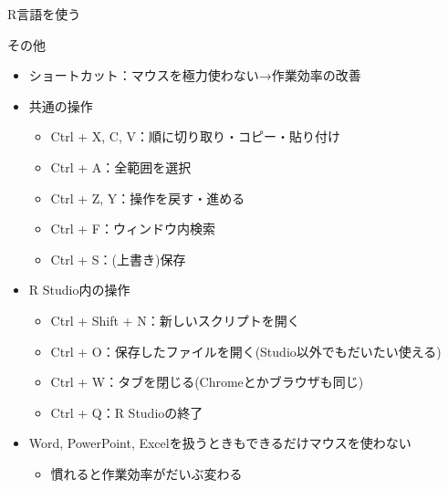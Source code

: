 \documentclass[
  ignorenonframetext,
]{beamer}
\providecommand{\tightlist}{%
  \setlength{\itemsep}{0pt}\setlength{\parskip}{0pt}}
\begin{document}
\begin{frame}[fragile]{R言語を使う}
\begin{block}{その他}
\protect\hypertarget{ux305dux306eux4ed6}{}
\begin{itemize}
\tightlist
\item
  ショートカット：マウスを極力使わない→作業効率の改善
\item
  共通の操作

  \begin{itemize}
  \tightlist
  \item
    Ctrl + X, C, V：順に切り取り・コピー・貼り付け
  \item
    Ctrl + A：全範囲を選択
  \item
    Ctrl + Z, Y：操作を戻す・進める
  \item
    Ctrl + F：ウィンドウ内検索
  \item
    Ctrl + S：(上書き)保存
  \end{itemize}
\item
  R Studio内の操作

  \begin{itemize}
  \tightlist
  \item
    Ctrl + Shift + N：新しいスクリプトを開く
  \item
    Ctrl + O：保存したファイルを開く(Studio以外でもだいたい使える)
  \item
    Ctrl + W：タブを閉じる(Chromeとかブラウザも同じ)
  \item
    Ctrl + Q：R Studioの終了
  \end{itemize}
\item
  Word, PowerPoint, Excelを扱うときもできるだけマウスを使わない

  \begin{itemize}
  \tightlist
  \item
    慣れると作業効率がだいぶ変わる
  \end{itemize}
\end{itemize}
\end{block}
\end{frame}
\end{document}
